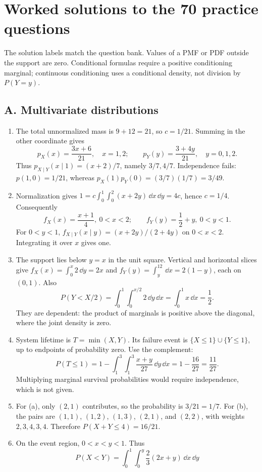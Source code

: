 \clearpage
\section{Worked solutions to the 70 practice questions}
The solution labels match the question bank. Values of a PMF or PDF outside the support are zero. Conditional formulas require a positive conditioning marginal; continuous conditioning uses a conditional density, not division by $P(Y=y)$.

\subsection{A. Multivariate distributions}
\begin{enumerate}[label=\textbf{A\arabic*.},leftmargin=*,itemsep=1em]
\item The total unnormalized mass is $9+12=21$, so $c=1/21$. Summing in the other coordinate gives
\[
p_X(x)=\frac{3x+6}{21},\quad x=1,2;\qquad
p_Y(y)=\frac{3+4y}{21},\quad y=0,1,2.
\]
Thus $p_{X\mid Y}(x\mid1)=(x+2)/7$, namely $3/7,4/7$. Independence fails: $p(1,0)=1/21$, whereas $p_X(1)p_Y(0)=(3/7)(1/7)=3/49$.
\item Normalization gives $1=c\int_0^1\int_0^2(x+2y)\,\dd x\,\dd y=4c$, hence $c=1/4$. Consequently
\[
f_X(x)=\frac{x+1}{4},\ 0<x<2;\qquad
f_Y(y)=\frac12+y,\ 0<y<1.
\]
For $0<y<1$, $f_{X\mid Y}(x\mid y)=(x+2y)/(2+4y)$ on $0<x<2$. Integrating it over $x$ gives one.
\item The support lies below $y=x$ in the unit square. Vertical and horizontal slices give $f_X(x)=\int_0^x2\,\dd y=2x$ and $f_Y(y)=\int_y^12\,\dd x=2(1-y)$, each on $(0,1)$. Also
\[
P(Y<X/2)=\int_0^1\int_0^{x/2}2\,\dd y\,\dd x=\int_0^1x\,\dd x=\frac12.
\]
They are dependent: the product of marginals is positive above the diagonal, where the joint density is zero.
\item System lifetime is $T=\min(X,Y)$. Its failure event is $\{X\leq1\}\cup\{Y\leq1\}$, up to endpoints of probability zero. Use the complement:
\[
P(T\leq1)=1-\int_1^3\int_1^3\frac{x+y}{27}\,\dd y\,\dd x
=1-\frac{16}{27}=\frac{11}{27}.
\]
Multiplying marginal survival probabilities would require independence, which is not given.
\item For (a), only $(2,1)$ contributes, so the probability is $3/21=1/7$. For (b), the pairs are $(1,1)$, $(1,2)$, $(1,3)$, $(2,1)$, and $(2,2)$, with weights $2,3,4,3,4$. Therefore $P(X+Y\leq4)=16/21$.
\item On the event region, $0<x<y<1$. Thus
\[
P(X<Y)=\int_0^1\int_0^y\frac23(2x+y)\,\dd x\,\dd y
\]
\end{enumerate}
